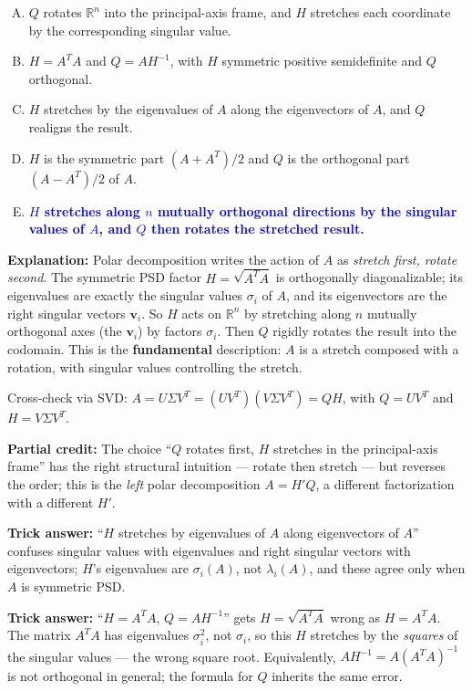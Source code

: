 \documentclass[12pt]{amsart}
\begin{document}
\begin{enumerate}[(A)]
\item $Q$ rotates $\mathbb{R}^n$ into the principal-axis frame, and $H$ stretches each coordinate by the corresponding singular value.
\item $H = A^T A$ and $Q = A H^{-1}$, with $H$ symmetric positive semidefinite and $Q$ orthogonal.
\item $H$ stretches by the eigenvalues of $A$ along the eigenvectors of $A$, and $Q$ realigns the result.
\item $H$ is the symmetric part $(A + A^T)/2$ and $Q$ is the orthogonal part $(A - A^T)/2$ of $A$.
\item \textcolor{blue}{\textbf{$H$ stretches along $n$ mutually orthogonal directions by the singular values of $A$, and $Q$ then rotates the stretched result.}}
\end{enumerate}

\textbf{Explanation:}
Polar decomposition writes the action of $A$ as \emph{stretch first, rotate
second}. The symmetric PSD factor $H = \sqrt{A^T A}$ is orthogonally
diagonalizable; its eigenvalues are exactly the singular values $\sigma_i$
of $A$, and its eigenvectors are the right singular vectors $\mathbf{v}_i$.
So $H$ acts on $\mathbb{R}^n$ by stretching along $n$ mutually orthogonal
axes (the $\mathbf{v}_i$) by factors $\sigma_i$. Then $Q$ rigidly rotates
the result into the codomain. This is the \textbf{fundamental} description:
$A$ is a stretch composed with a rotation, with singular values controlling
the stretch.

Cross-check via SVD: $A = U \Sigma V^T = (UV^T)(V \Sigma V^T) = QH$, with
$Q = UV^T$ and $H = V \Sigma V^T$.

\textbf{Partial credit:}
The choice ``$Q$ rotates first, $H$ stretches in the principal-axis frame''
has the right structural intuition --- rotate then stretch --- but reverses
the order; this is the \emph{left} polar decomposition $A = H'Q$, a
different factorization with a different $H'$.

\textbf{Trick answer:}
``$H$ stretches by eigenvalues of $A$ along eigenvectors of $A$'' confuses
singular values with eigenvalues and right singular vectors with
eigenvectors; $H$'s eigenvalues are $\sigma_i(A)$, not $\lambda_i(A)$, and
these agree only when $A$ is symmetric PSD.

\textbf{Trick answer:}
``$H = A^T A$, $Q = A H^{-1}$'' gets $H = \sqrt{A^T A}$ wrong as $H = A^T A$.
The matrix $A^T A$ has eigenvalues $\sigma_i^2$, not $\sigma_i$, so this
$H$ stretches by the \emph{squares} of the singular values --- the wrong
square root. Equivalently, $A H^{-1} = A (A^T A)^{-1}$ is not orthogonal
in general; the formula for $Q$ inherits the same error.
\end{document}
